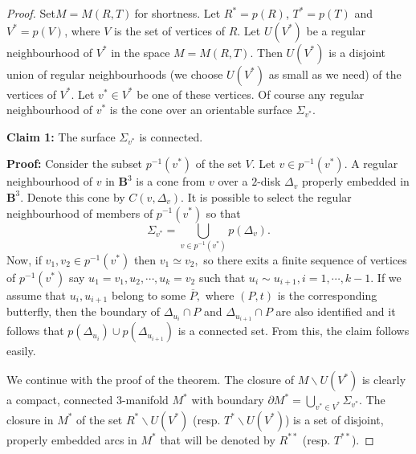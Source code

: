 \documentclass{amsproc}\usepackage{eurosym}
\theoremstyle{plain}
\numberwithin{equation}{section}
\begin{document}
\begin{proof}
Set\thinspace$M=M\left(  R,T\right)  \ $for shortness. Let $R^{\ast}=p(R)$,
$T^{\ast}=p(T)$ and $V^{\ast}=p(V)$, where $V$ is the set of vertices of $R. $
Let $U(V^{\ast})$ be a regular neighbourhood of $V^{\ast}$ in the space
$M=M\left(  R,T\right)  .$ Then $U(V^{\ast})$ is a disjoint union of regular
neighbourhoods (we choose $U(V^{\ast})$ as small as we need) of the vertices
of $V^{\ast}$. Let $v^{\ast}\in V^{\ast}$ be one of these vertices. Of course
any regular neighbourhood of $v^{\ast}$ is the cone over an orientable surface
$\Sigma_{v^{\ast}}.$

\textbf{Claim 1: }The surface $\Sigma_{v^{\ast}}$ is connected.

\textbf{Proof: }Consider the subset $p^{-1}\left(  v^{\ast}\right)  $ of the
set $V.$ Let $v\in p^{-1}\left(  v^{\ast}\right)  .$ A regular neighbourhood
of $v$ in $\mathbf{B}^{3}$ is a cone from $v$ over a $2$-disk $\Delta_{v}$
properly embedded in $\mathbf{B}^{3}$. Denote this cone by $C\left(
v,\Delta_{v}\right)  .$ It is possible to select the regular neighbourhood of
members of $p^{-1}\left(  v^{\ast}\right)  $ so that
\[
\Sigma_{v^{\ast}}=
{\textstyle\bigcup_{v\in p^{-1}\left(  v^{\ast}\right)  }}p\left(  \Delta_{v}\right).
\]
Now, if $v_{1},v_{2}\in p^{-1}\left(  v^{\ast}\right)  $ then $v_{1}\simeq
v_{2},$ so there exits a finite sequence of vertices of $p^{-1}\left(
v^{\ast}\right)  $ say $u_{1}=v_{1},u_{2},\cdots,u_{k}=v_{2}$ such that
$u_{i}\sim u_{i+1},i=1,\cdots,k-1$. If we assume that $u_{i},u_{i+1}$ belong
to some $\overline{P},$ where $(P,t)$ is the corresponding butterfly, then the
boundary of $\Delta_{u_{i}}\cap P$ and $\Delta_{u_{i+1}}\cap P$ are also
identified and it follows that $p\left(  \Delta_{u_{i}}\right)  \cup p\left(
\Delta_{u_{i+1}}\right)  $ is a connected set. From this, the claim follows easily.

We continue with the proof of the theorem. The closure of $M\smallsetminus
U\left(  V^{\ast}\right)  $ is clearly a compact, connected $3$-manifold
$M^{\ast}$ with boundary $\partial M^{\ast}=
{\textstyle\bigcup_{v^{\ast}\in V^{\ast}}}\Sigma_{v^{\ast}}.$ 
The closure in $M^{\ast}$ of the set $R^{\ast
}\smallsetminus U\left(  V^{\ast}\right)  $ (resp. $T^{\ast}\smallsetminus
U\left(  V^{\ast}\right)  $) is a set of disjoint, properly embedded arcs in
$M^{\ast}$ that will be denoted by $R^{\ast\ast}$ (resp. $T^{\ast\ast}$).


\end{proof}
\end{document}
